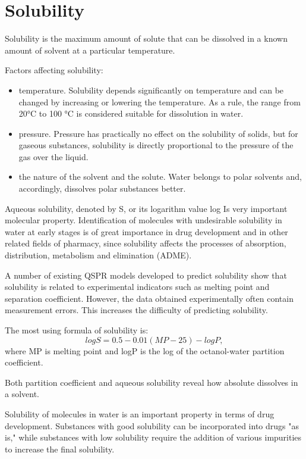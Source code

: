 \documentclass[a4paper,14pt]{article}
\begin{document}
\section{Solubility}\label{2}
Solubility is the maximum amount of solute that can be dissolved in a known amount of solvent at a particular temperature.

Factors affecting solubility:
\begin {itemize}
\item {temperature. Solubility depends significantly on temperature and can be changed by increasing or lowering the temperature. As a rule, the range from 20°C to 100 °C is considered suitable for dissolution in water.}

\item{pressure. Pressure has practically no effect on the solubility of solids, but for gaseous substances, solubility is directly proportional to the pressure of the gas over the liquid.}

\item{the nature of the solvent and the solute. Water belongs to polar solvents and, accordingly, dissolves polar substances better.}
\end {itemize}

Aqueous solubility, denoted by S, or its logarithm value log Is very important molecular property. Identification of
molecules with undesirable solubility in water at early stages is of great importance in drug development and in other related fields of pharmacy, since solubility affects the processes of absorption, distribution, metabolism and elimination (ADME).

A number of existing QSPR models developed to predict solubility show that solubility is related to experimental indicators such as melting point and separation coefficient.
However, the data obtained experimentally often contain measurement errors. This increases the difficulty of predicting solubility.

The most using formula of solubility is:
\begin {equation}
 logS =  0.5 - 0.01(MP - 25) - logP,
\end{equation}
where MP is melting point and logP is the log of the octanol-water partition coefficient.

Both partition coefficient and aqueous solubility reveal how
absolute dissolves in a solvent.

Solubility of molecules in water is an important property in terms of drug development. Substances with good solubility can be incorporated into drugs "as is," while substances with low solubility require the addition of various impurities to increase the final solubility. 
\end{document}
